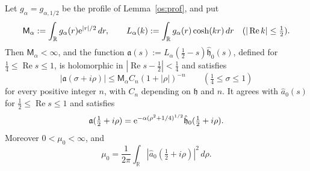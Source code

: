 \begin{lemma}\label{ev:mellinlemma}
Let $g_\alpha=g_{\alpha,1/2}$ be the profile of Lemma~\ref{os:prof}, and put
\[
\mathsf M_\alpha:=\int_{\mathbb R}g_\alpha(r)\mathrm{e}^{|r|/2}\,dr,\qquad L_\alpha(k):=\int_{\mathbb R}g_\alpha(r)\cosh(kr)\,dr\quad(|\operatorname{Re}k|\le\tfrac12).
\]
Then $\mathsf M_\alpha<\infty$, and the function
$\mathfrak a(s):=L_\alpha(\tfrac12-s)\hat{\mathfrak h}_0(s)$, defined for $\tfrac14\le\operatorname{Re}s\le1$, is holomorphic in $|\operatorname{Re}s-\tfrac12|<\tfrac14$ and satisfies
\begin{equation}\label{ev:mellin}
 |\mathfrak a(\sigma+i\rho)|\le \mathsf M_\alpha C_n(1+|\rho|)^{-n}\qquad(\tfrac14\le\sigma\le1)
\end{equation}
for every positive integer $n$, with $C_n$ depending on $\mathfrak h$ and $n$.
It agrees with $\hat a_0(s)$ for $\tfrac12\le\operatorname{Re}s\le1$ and satisfies
\[
 \mathfrak a(\tfrac12+i\rho)=\mathrm{e}^{-\alpha(\rho^2+1/4)^{1/2}}\hat{\mathfrak h}_0(\tfrac12+i\rho).
\]
Moreover $0<\mu_0<\infty$, and
\begin{equation}\label{ev:mu0}
 \mu_0=\frac1{2\pi}\int_{\mathbb R}|\hat a_0(\tfrac12+i\rho)|^2\,d\rho .
\end{equation}
\end{lemma}
